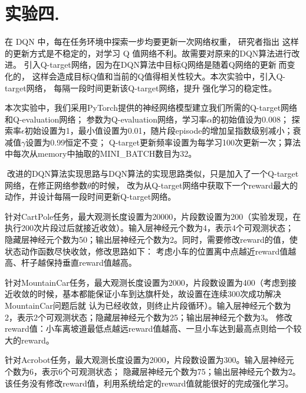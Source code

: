 \documentclass[a4paper,UTF8]{article}
\theoremstyle{definition}
\begin{document}
\section*{实验四. }
在 DQN 中，每在任务环境中探索一步均要更新一次网络权重，
研究者指出 这样的更新方式是不稳定的，对学习 Q 值网络不利。故需要对原来的DQN算法进行改进。
引入Q-target网络，因为在DQN算法中目标Q网络是随着Q网络的更新而变化的，
这样会造成目标Q值和当前的Q值得相关性较大。本次实验中，引入Q-target网络，
每隔一段时间更新该Q-target网络，提升强化学习的稳定性。
	
本次实验中，我们采用PyTorch提供的神经网络模型建立我们所需的Q-target网络和Q-evaluation网络；
参数为Q-evaluation网络，学习率$\alpha$的初始值设为0.008；
探索率$\epsilon$初始设置为1，最小值设置为0.01，随片段episode的增加呈指数级别减小；衰减值$\gamma$设置为0.99恒定不变；
Q-target更新频率设置为每学习100次更新一次；算法中每次从memory中抽取的MINI\_BATCH数目为32。

改进的DQN算法实现思路与DQN算法的实现思路类似，只是加入了一个Q-target网络，在修正网络参数$\theta$的时候，
改为从Q-target网络中获取下一个reward最大的动作，并设计每隔一段时间更新Q-target网络。



针对CartPole任务，最大观测长度设置为20000，片段数设置为200（实验发现，在执行200次片段过后就接近收敛）。输入层神经元个数为4，表示4个可观测状态；
隐藏层神经元个数为50；输出层神经元个数为2。同时，需要修改reward的值，使状态动作函数尽快收敛，修改思路如下：
考虑小车的位置离中点越近reward值越高、杆子越保持垂直reward值越高。

针对MountainCar任务，最大观测长度设置为2000，片段数设置为400（考虑到接近收敛的时候，基本都能保证小车到达旗杆处，故设置在连续300次成功解决MountainCar问题后就
认为已经收敛，则终止片段循环）。输入层神经元个数为2，表示2个可观测状态；隐藏层神经元个数为25；输出层神经元个数为3。
修改reward值：小车离坡道最低点越远reward值越高、一旦小车达到最高点则给一个较大的reward。

针对Acrobot任务，最大观测长度设置为2000，片段数设置为300。输入层神经元个数为6，表示6个可观测状态；
隐藏层神经元个数为75；输出层神经元个数为2。该任务没有修改reward值，利用系统给定的reward值就能很好的完成强化学习。
\end{document}
